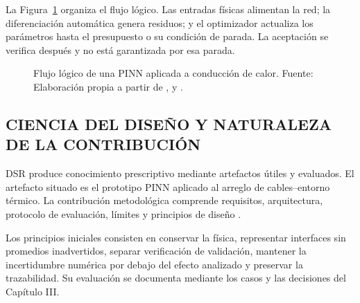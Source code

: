 La Figura~\ref{fig:flujo-pinn} organiza el flujo lógico. Las entradas físicas alimentan la red; la diferenciación automática genera residuos; y el optimizador actualiza los parámetros hasta el presupuesto o su condición de parada. La aceptación se verifica después y no está garantizada por esa parada.

\begin{figure}[htbp]
\centering
{}
\caption{Flujo lógico de una PINN aplicada a conducción de calor. Fuente: Elaboración propia a partir de \textcite{raissi2019}, \textcite{lawal2022} y \textcite{pan2025}.}
\label{fig:flujo-pinn}
\end{figure}

\subsection{CIENCIA DEL DISEÑO Y NATURALEZA DE LA CONTRIBUCIÓN}

DSR produce conocimiento prescriptivo mediante artefactos útiles y evaluados. El artefacto situado es el prototipo PINN aplicado al arreglo de cables--entorno térmico. La contribución metodológica comprende requisitos, arquitectura, protocolo de evaluación, límites y principios de diseño \parencite[343--349]{gregor2013}.

Los principios iniciales consisten en conservar la física, representar interfaces sin promedios inadvertidos, separar verificación de validación, mantener la incertidumbre numérica por debajo del efecto analizado y preservar la trazabilidad. Su evaluación se documenta mediante los casos y las decisiones del Capítulo III.


